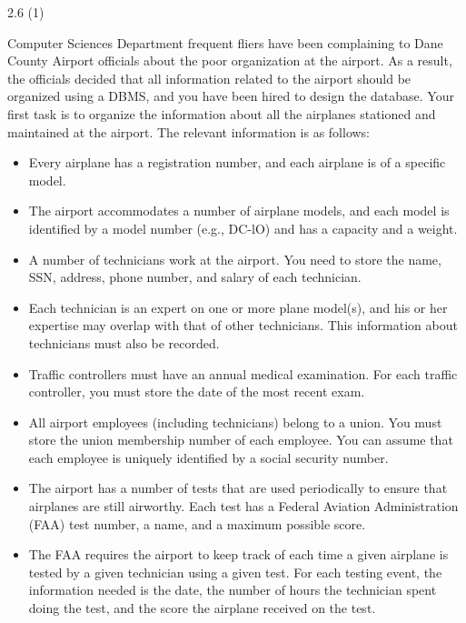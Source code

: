 \begin{problem}{2.6 (1)}

  Computer Sciences Department frequent fliers have been complaining to Dane County Airport officials about the poor
  organization at the airport. As a result, the officials decided that all information related to the airport should be
  organized using a DBMS, and you have been hired to design the database. Your first task is to organize the information
  about all the airplanes stationed and maintained at the airport. The relevant information is as follows:

  \begin{itemize}
    \item Every airplane has a registration number, and each airplane is of a specific model.
    \item The airport accommodates a number of airplane models, and each model is identified by
          a model number (e.g., DC-lO) and has a capacity and a weight.
    \item A number of technicians work at the airport. You need to store the name, SSN, address,
          phone number, and salary of each technician.
    \item Each technician is an expert on one or more plane model(s), and his or her expertise may overlap with that of other technicians.      This information about technicians must also be recorded.
    \item Traffic controllers must have an annual medical examination. For each traffic controller, you must store the
          date of the most   recent exam.
    \item All airport employees (including technicians) belong to a union. You must store the union membership number of
          each employee. You can assume that each employee is uniquely identified by a social security number.
    \item The airport has a number of tests that are used periodically to ensure that airplanes are still airworthy.
          Each test has a Federal Aviation Administration (FAA) test number, a name, and a maximum possible score.
    \item The FAA requires the airport to keep track of each time a given airplane is tested by a given technician using
          a given test. For each testing event, the information needed is the date, the number of hours the technician
          spent doing the test, and the score the airplane received on the test.
  \end{itemize}


\end{problem}
